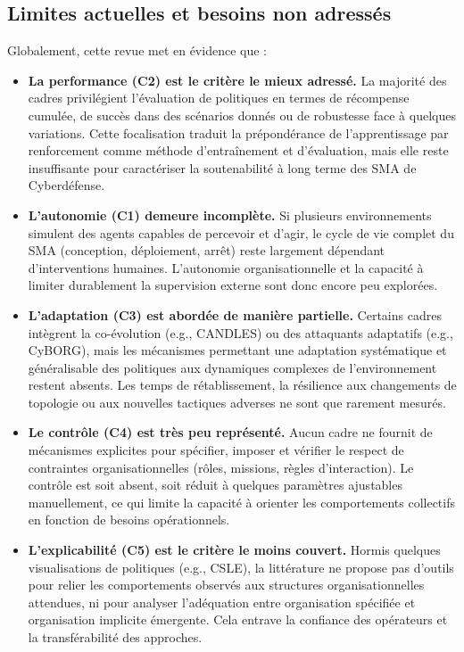 \subsection{Limites actuelles et besoins non adressés}

Globalement, cette revue met en évidence que :
\begin{itemize}
  \item \textbf{La performance (C2) est le critère le mieux adressé.} La majorité des cadres privilégient l'évaluation de politiques en termes de récompense cumulée, de succès dans des scénarios donnés ou de robustesse face à quelques variations. Cette focalisation traduit la prépondérance de l'apprentissage par renforcement comme méthode d'entraînement et d'évaluation, mais elle reste insuffisante pour caractériser la soutenabilité à long terme des SMA de Cyberdéfense.

  \item \textbf{L'autonomie (C1) demeure incomplète.} Si plusieurs environnements simulent des agents capables de percevoir et d'agir, le cycle de vie complet du SMA (conception, déploiement, arrêt) reste largement dépendant d'interventions humaines. L'autonomie organisationnelle et la capacité à limiter durablement la supervision externe sont donc encore peu explorées.

  \item \textbf{L'adaptation (C3) est abordée de manière partielle.} Certains cadres intègrent la co-évolution (e.g., CANDLES) ou des attaquants adaptatifs (e.g., CyBORG), mais les mécanismes permettant une adaptation systématique et généralisable des politiques aux dynamiques complexes de l'environnement restent absents. Les temps de rétablissement, la résilience aux changements de topologie ou aux nouvelles tactiques adverses ne sont que rarement mesurés.

  \item \textbf{Le contrôle (C4) est très peu représenté.} Aucun cadre ne fournit de mécanismes explicites pour spécifier, imposer et vérifier le respect de contraintes organisationnelles (rôles, missions, règles d'interaction). Le contrôle est soit absent, soit réduit à quelques paramètres ajustables manuellement, ce qui limite la capacité à orienter les comportements collectifs en fonction de besoins opérationnels.

  \item \textbf{L'explicabilité (C5) est le critère le moins couvert.} Hormis quelques visualisations de politiques (e.g., CSLE), la littérature ne propose pas d'outils pour relier les comportements observés aux structures organisationnelles attendues, ni pour analyser l'adéquation entre organisation spécifiée et organisation implicite émergente. Cela entrave la confiance des opérateurs et la transférabilité des approches.
\end{itemize}

